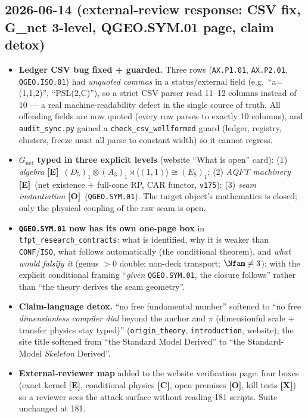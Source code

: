 \documentclass[11pt]{article}
\providecommand{\mE}{\textbf{[E]}}\providecommand{\mC}{\textbf{[C]}}
\providecommand{\mO}{\textbf{[O]}}\providecommand{\mX}{\textbf{[X]}}
\providecommand{\vref}[1]{\texttt{#1}}
\begin{document}
\subsection*{2026-06-14 (external-review response: CSV fix, G\_net 3-level, QGEO.SYM.01 page, claim detox)}
\begin{itemize}
\item \textbf{Ledger CSV bug fixed + guarded.} Three rows (\texttt{AX.P1.01}, \texttt{AX.P2.01},
  \texttt{QGEO.ISO.01}) had \emph{unquoted commas} in a status/external field (e.g.\ ``a=(1,1,2)'',
  ``PSL(2,C)''), so a strict CSV parser read 11--12 columns instead of 10 --- a real
  machine-readability defect in the single source of truth. All offending fields are now quoted (every
  row parses to exactly 10 columns), and \texttt{audit\_sync.py} gained a \texttt{check\_csv\_wellformed}
  guard (ledger, registry, clusters, freeze must all parse to constant width) so it cannot regress.
\item \textbf{$G_{\mathrm{net}}$ typed in three explicit levels} (website ``What is open'' card): (1)
  \emph{algebra} \mE\ $(D_5)_1{\otimes}(A_3)_1{\rtimes}\langle(1,1)\rangle\cong(E_8)_1$; (2) \emph{AQFT
  machinery} \mE\ (net existence $+$ full-cone RP, CAR functor, \vref{v175}); (3) \emph{seam
  instantiation} \mO\ (\texttt{QGEO.SYM.01}). The target object's mathematics is closed; only the
  physical coupling of the raw seam is open.
\item \textbf{\texttt{QGEO.SYM.01} now has its own one-page box} in \texttt{tfpt\_research\_contracts}:
  what is identified, why it is weaker than \texttt{CONF}/\texttt{ISO}, what follows automatically (the
  conditional theorem), and \emph{what would falsify it} (genus $>0$ double; non-deck transport;
  $\Nfam\neq3$); with the explicit conditional framing ``\emph{given} \texttt{QGEO.SYM.01}, the closure
  follows'' rather than ``the theory derives the seam geometry''.
\item \textbf{Claim-language detox.} ``no free fundamental number'' softened to ``no free
  \emph{dimensionless compiler dial} beyond the anchor and $\pi$ (dimensionful scale $+$ transfer
  physics stay typed)'' (\texttt{origin\_theory}, \texttt{introduction}, website); the site title
  softened from ``the Standard Model Derived'' to ``the Standard-Model \emph{Skeleton} Derived''.
\item \textbf{External-reviewer map} added to the website verification page: four boxes (exact kernel
  \mE, conditional physics \mC, open premises \mO, kill tests \mX) so a reviewer sees the attack
  surface without reading 181 scripts. Suite unchanged at 181.
\end{itemize}
\end{document}
